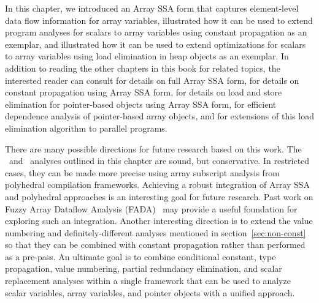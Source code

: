 
In this chapter,
we introduced an Array SSA form 
that captures element-level data flow information for array variables,
illustrated how it can be used to extend program analyses for
scalars to array variables using constant propagation 
as an exemplar, and illustrated how it can be used to extend
optimizations for scalars to array variables using load elimination in
heap objects as
an exemplar.
In addition to reading the other chapters in this book for related
topics, the interested reader can consult \cite{KnSa98} for 
details on full Array SSA form, \cite{KnSa98b} for details on constant
propagation using Array SSA form, \cite{FiKS00} for
details on load and store elimination for pointer-based objects using
Array SSA form, \cite{SaFi01} for efficient dependence analysis of
pointer-based array objects, and \cite{BaSa09} for extensions of this load
elimination algorithm to parallel programs.


There are many possible directions for future research based on this
work.
The \ds\ and \dd\ analyses outlined in this chapter are sound, but
conservative.  In restricted cases, they can be made more precise using array subscript
analysis from polyhedral compilation frameworks.  Achieving a robust
integration of Array SSA and polyhedral approaches is an interesting goal for future
research.  Past work on Fuzzy Array Dataflow Analysis
(FADA)~\cite{BCF97} may provide a useful foundation for exploring such
an integration.
Another interesting direction is to extend the value numbering and 
definitely-different analyses mentioned in section~\ref{sec:non-const}
so that they can be combined with constant propagation
rather than performed as a pre-pass.
An ultimate goal is
to combine conditional constant, type propagation, value numbering, partial redundancy elimination,
and scalar replacement analyses within a single framework that can be
used to analyze scalar variables, array variables, and pointer objects
with a unified approach.
